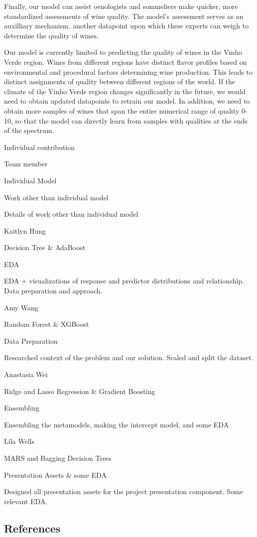 \documentclass[
  letterpaper,
  DIV=11,
  numbers=noendperiod]{scrartcl}
\begin{document}
Finally, our model can assist oenologists and sommeliers make quicker,
more standardized assessments of wine quality. The model's assessment
serves as an auxilliary mechanism, another datapoint upon which these
experts can weigh to determine the quality of wines.

Our model is currently limited to predicting the quality of wines in the
Vinho Verde region. Wines from different regions have distinct flavor
profiles based on environmental and procedural factors determining wine
production. This leads to distinct assignments of quality between
different regions of the world. If the climate of the Vinho Verde region
changes significantly in the future, we would need to obtain updated
datapoints to retrain our model. In addition, we need to obtain more
samples of wines that span the entire numerical range of quality 0-10,
so that the model can directly learn from samples with qualities at the
ends of the spectrum.

Individual contribution

Team member

Individual Model

Work other than individual model

Details of work other than individual model

Kaitlyn Hung

Decision Tree \& AdaBoost

EDA

EDA + visualizations of response and predictor distributions and
relationship. Data preparation and approach.

Amy Wang

Random Forest \& XGBoost

Data Preparation

Researched context of the problem and our solution. Scaled and split the
dataset.

Anastasia Wei

Ridge and Lasso Regression \& Gradient Boosting

Ensembling

Ensembling the metamodels, making the intercept model, and some EDA

Lila Wells

MARS and Bagging Decision Trees

Presentation Assets \& some EDA

Designed all presentation assets for the project presentation component.
Some relevant EDA.

\hypertarget{references}{%
\subsection*{References}\label{references}}
\end{document}
